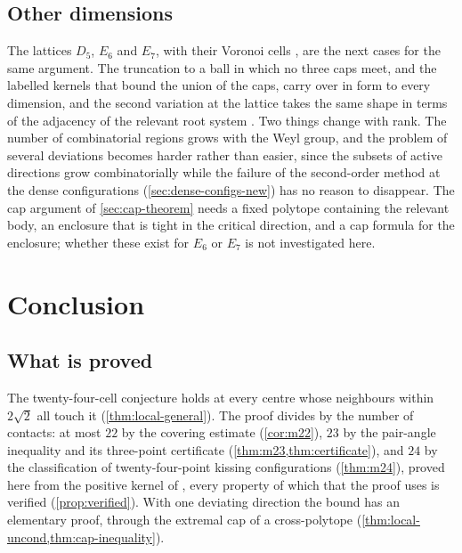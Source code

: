 \documentclass[11pt,reqno]{amsart}
\renewcommand{\_}{\origunderscore\allowbreak}
\numberwithin{equation}{section}
\theoremstyle{plain}
\theoremstyle{definition}
\theoremstyle{remark}
\begin{document}
\subsection{Other dimensions}\label{sec:other-dims-new}

The lattices $D_5$, $E_6$ and $E_7$, with their Voronoi cells
\cite{CS1988,Cox73}, are the next cases for the same argument.
The truncation to a ball in which no three caps meet, and the labelled
kernels that bound the union of the caps, carry over in form to every
dimension, and the second variation at the lattice takes the same shape in
terms of the adjacency of the relevant root system \cite{Hum90}. Two things
change with rank. The number of combinatorial regions grows with the Weyl
group, and the problem of several deviations becomes harder rather than
easier, since the subsets of active directions grow combinatorially while
the failure of the second-order method at the dense configurations
(\cref{sec:dense-configs-new}) has no reason to disappear. The cap argument of \cref{sec:cap-theorem} needs a fixed polytope
containing the relevant body, an enclosure that is tight in the critical
direction, and a cap formula for the enclosure; whether these exist for
$E_6$ or $E_7$ is not investigated here.

\section{Conclusion}\label{sec:status}

\subsection{What is proved}

The twenty-four-cell conjecture holds at every centre whose neighbours
within $2\sqrt2$ all touch it (\cref{thm:local-general}). The proof divides
by the number of contacts: at most $22$ by the covering estimate
(\cref{cor:m22}), $23$ by the pair-angle inequality and its three-point
certificate (\cref{thm:m23,thm:certificate}), and $24$ by the classification
of twenty-four-point kissing configurations (\cref{thm:m24}), proved here
from the positive kernel of \cite{LLM24}, every property of which that the
proof uses is verified (\cref{prop:verified}). With one deviating direction
the bound has an elementary proof, through the extremal cap of a
cross-polytope (\cref{thm:local-uncond,thm:cap-inequality}).
\end{document}
